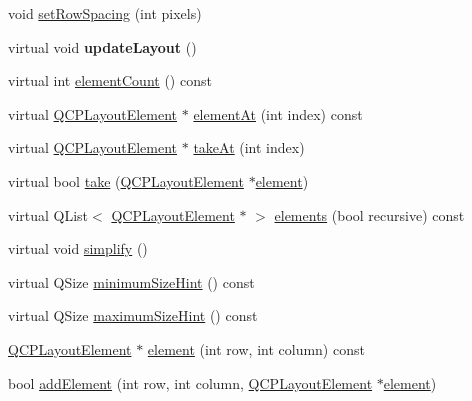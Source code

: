 \begin{DoxyCompactItemize}
\item 
void \mbox{\hyperlink{class_q_c_p_layout_grid_aaef2cd2d456197ee06a208793678e436}{set\+Row\+Spacing}} (int pixels)
\item 
\mbox{\label{class_q_c_p_layout_grid_a07f8dd7d3d61d7345026621d446042a4}} 
virtual void {\bfseries update\+Layout} ()
\item 
virtual int \mbox{\hyperlink{class_q_c_p_layout_grid_a77f194843d037e0da6d5f3170acdf3a2}{element\+Count}} () const
\item 
virtual \mbox{\hyperlink{class_q_c_p_layout_element}{Q\+C\+P\+Layout\+Element}} $\ast$ \mbox{\hyperlink{class_q_c_p_layout_grid_a97672ecc379cb3a09639926ba9980297}{element\+At}} (int index) const
\item 
virtual \mbox{\hyperlink{class_q_c_p_layout_element}{Q\+C\+P\+Layout\+Element}} $\ast$ \mbox{\hyperlink{class_q_c_p_layout_grid_acc1277394ff8a6432e111ff9463e6375}{take\+At}} (int index)
\item 
virtual bool \mbox{\hyperlink{class_q_c_p_layout_grid_a666a9fe9e92054436f9b66eba25cca0c}{take}} (\mbox{\hyperlink{class_q_c_p_layout_element}{Q\+C\+P\+Layout\+Element}} $\ast$\mbox{\hyperlink{class_q_c_p_layout_grid_a602b426609b4411cf6a93c3ddf3a381a}{element}})
\item 
virtual Q\+List$<$ \mbox{\hyperlink{class_q_c_p_layout_element}{Q\+C\+P\+Layout\+Element}} $\ast$ $>$ \mbox{\hyperlink{class_q_c_p_layout_grid_a20a745d013de4c89cf5de8004a5a36f7}{elements}} (bool recursive) const
\item 
virtual void \mbox{\hyperlink{class_q_c_p_layout_grid_a08bba60e4acd20165526a8fd7f986b58}{simplify}} ()
\item 
virtual Q\+Size \mbox{\hyperlink{class_q_c_p_layout_grid_a9ef4b0d626708a1ada2cfea3a5973b80}{minimum\+Size\+Hint}} () const
\item 
virtual Q\+Size \mbox{\hyperlink{class_q_c_p_layout_grid_a3720d1b79931b2bdec3f2158a5f0181c}{maximum\+Size\+Hint}} () const
\item 
\mbox{\hyperlink{class_q_c_p_layout_element}{Q\+C\+P\+Layout\+Element}} $\ast$ \mbox{\hyperlink{class_q_c_p_layout_grid_a602b426609b4411cf6a93c3ddf3a381a}{element}} (int row, int column) const
\item 
bool \mbox{\hyperlink{class_q_c_p_layout_grid_adff1a2ca691ed83d2d24a4cd1fe17012}{add\+Element}} (int row, int column, \mbox{\hyperlink{class_q_c_p_layout_element}{Q\+C\+P\+Layout\+Element}} $\ast$\mbox{\hyperlink{class_q_c_p_layout_grid_a602b426609b4411cf6a93c3ddf3a381a}{element}})

\end{DoxyCompactItemize}

